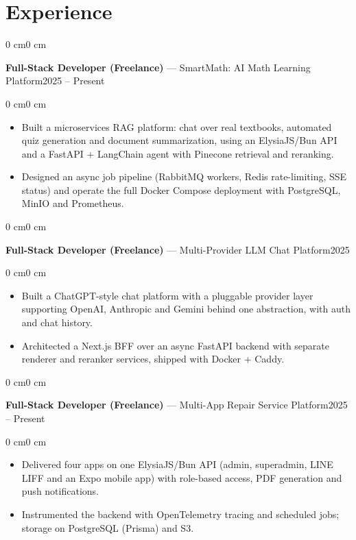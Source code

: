 \documentclass[10pt, letterpaper]{article}
\newenvironment{highlights}{
    \begin{itemize}[
        topsep=0.06 cm,
        parsep=0.06 cm,
        itemsep=0pt,
        leftmargin=0 cm + 10pt
    ]
}{
    \end{itemize}
}
\newenvironment{onecolentry}{
    \begin{adjustwidth}{0 cm}{0 cm}
}{
    \end{adjustwidth}
}
\newcommand{\datedentry}[2]{%
  \begin{onecolentry}
    \noindent #1\hfill #2%
  \end{onecolentry}
}
\begin{document}
\section{Experience}

\datedentry{\textbf{Full-Stack Developer (Freelance)} — SmartMath: AI Math Learning Platform}{2025 -- Present}
\vspace{0.1 cm}

\begin{onecolentry}
    \begin{highlights}
        \item Built a microservices RAG platform: chat over real textbooks, automated quiz generation and document summarization, using an ElysiaJS/Bun API and a FastAPI + LangChain agent with Pinecone retrieval and reranking.
        \item Designed an async job pipeline (RabbitMQ workers, Redis rate-limiting, SSE status) and operate the full Docker Compose deployment with PostgreSQL, MinIO and Prometheus.
    \end{highlights}
\end{onecolentry}

\vspace{0.12 cm}

\datedentry{\textbf{Full-Stack Developer (Freelance)} — Multi-Provider LLM Chat Platform}{2025}
\vspace{0.1 cm}

\begin{onecolentry}
    \begin{highlights}
        \item Built a ChatGPT-style chat platform with a pluggable provider layer supporting OpenAI, Anthropic and Gemini behind one abstraction, with auth and chat history.
        \item Architected a Next.js BFF over an async FastAPI backend with separate renderer and reranker services, shipped with Docker + Caddy.
    \end{highlights}
\end{onecolentry}

\vspace{0.12 cm}

\datedentry{\textbf{Full-Stack Developer (Freelance)} — Multi-App Repair Service Platform}{2025 -- Present}
\vspace{0.1 cm}

\begin{onecolentry}
    \begin{highlights}
        \item Delivered four apps on one ElysiaJS/Bun API (admin, superadmin, LINE LIFF and an Expo mobile app) with role-based access, PDF generation and push notifications.
        \item Instrumented the backend with OpenTelemetry tracing and scheduled jobs; storage on PostgreSQL (Prisma) and S3.
    \end{highlights}
\end{onecolentry}
\end{document}
